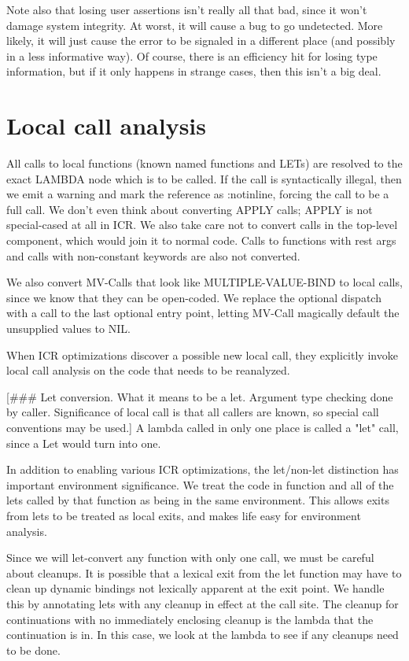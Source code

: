 Note also that losing user assertions isn't really all that bad, since it won't
damage system integrity.  At worst, it will cause a bug to go undetected.  More
likely, it will just cause the error to be signaled in a different place (and
possibly in a less informative way).  Of course, there is an efficiency hit for
losing type information, but if it only happens in strange cases, then this
isn't a big deal.


\chapter{Local call analysis}

All calls to local functions (known named functions and LETs) are resolved to
the exact LAMBDA node which is to be called.  If the call is syntactically
illegal, then we emit a warning and mark the reference as :notinline, forcing
the call to be a full call.  We don't even think about converting APPLY calls;
APPLY is not special-cased at all in ICR.  We also take care not to convert
calls in the top-level component, which would join it to normal code.  Calls to
functions with rest args and calls with non-constant keywords are also not
converted.

We also convert MV-Calls that look like MULTIPLE-VALUE-BIND to local calls,
since we know that they can be open-coded.  We replace the optional dispatch
with a call to the last optional entry point, letting MV-Call magically default
the unsupplied values to NIL.

When ICR optimizations discover a possible new local call, they explicitly
invoke local call analysis on the code that needs to be reanalyzed. 

[\#\#\# Let conversion.  What it means to be a let.  Argument type checking done
by caller.  Significance of local call is that all callers are known, so
special call conventions may be used.]
A lambda called in only one place is called a "let" call, since a Let would
turn into one.

In addition to enabling various ICR optimizations, the let/non-let distinction
has important environment significance.  We treat the code in function and all
of the lets called by that function as being in the same environment.  This
allows exits from lets to be treated as local exits, and makes life easy for
environment analysis.  

Since we will let-convert any function with only one call, we must be careful
about cleanups.  It is possible that a lexical exit from the let function may
have to clean up dynamic bindings not lexically apparent at the exit point.  We
handle this by annotating lets with any cleanup in effect at the call site.
The cleanup for continuations with no immediately enclosing cleanup is the
lambda that the continuation is in.  In this case, we look at the lambda to see
if any cleanups need to be done.

